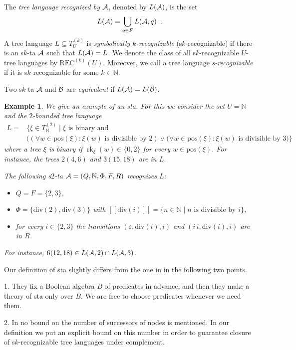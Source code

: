 \documentclass[10pt]{scrartcl}
\newtheorem{ex}[df]{Example}
\newcommand{\nat}{\mathbb{N}}
\newcommand{\seml}{[\![}
\newcommand{\semr}{]\!]}
\newcommand{\pos}{\mathrm{pos}}
\newcommand{\REC}{\mathrm{REC}}
\newcommand{\A}{{\cal A}}
\newcommand{\B}{{\cal B}}
\DeclareMathOperator{\rk}{rk}
\begin{document}
The \emph{tree language recognized by $\A$}, denoted by $L(\A)$, is the set 
\[
L(\A) = \bigcup_{q \in F} L(\A,q)\enspace.
\]
A tree language $L \subseteq T_U^{(k)}$ is {\em symbolically $k$-recognizable} (s$k$-recognizable) if there is an s$k$-ta $\A$ such that $L(\A) = L$. We denote the class of all s$k$-recognizable $U$-tree languages by $\REC^{(k)}(U)$. Moreover, we call a tree language {\em s-recognizable} if it is s$k$-recognizable for some $k\in \nat$.

Two s$k$-ta $\A$ and $\B$ are \emph{equivalent} if $L(\A) = L(\B)$.


\begin{ex}\rm\label{ex:sta} We give an example of an  sta. For this we consider the set $U = \nat$ and the $2$-bounded tree language 
\[
\begin{array}{ll}
L = & \big\{  \xi \in T_\nat^{(2)} \mid \text{$\xi$ is binary and }\\[2mm]
&\big((\forall w \in \pos(\xi): \xi(w) \text{ is divisible by $2$}) \vee (\forall w \in \pos(\xi): \xi(w) \text{ is divisible by $3$}\big)\big\}
\end{array}
\]
where a tree $\xi$ is binary if $\rk_\xi(w) \in \{0,2\}$ for every $w \in \pos(\xi)$. For instance, the trees $2(4,6)$ and $3(15,18)$ are in $L$.

The following s$2$-ta $\A = (Q,\nat,\Phi,F,R)$ recognizes $L$:
\begin{itemize} 
\item $Q = F = \{2,3\}$, 
\item $\Phi = \{\mathrm{div}(2),\mathrm{div}(3)\}$ with $\seml \mathrm{div}(i) \semr = \{n \in \nat \mid n \text{ is divisible by $i$}\}$, 
\item for every $i \in \{2,3\}$ the transitions $(\varepsilon, \mathrm{div}(i), i)$ and $(i\, i, \mathrm{div}(i), i)$ are in $R$.
\end{itemize}
For instance, $6(12,18) \in L(\A,2) \cap L(\A,3)$. 
\end{ex}

Our definition of sta slightly differs from the one in \cite{veabjo11a} in the following two points.

1. They fix a Boolean algebra $B$ of predicates in advance, and then they make a theory of sta only over $B$. We are free to choose predicates whenever we need them.

2. In \cite{veabjo11a} no bound on the number of successors of nodes is mentioned. In our definition we put an explicit bound on this number in order to guarantee closure of s$k$-recognizable tree languages under complement.
\end{document}
